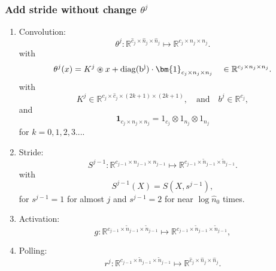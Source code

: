 \subsubsection{Add stride without change $\theta^j$}
\begin{enumerate}
	
	\item Convolution: 
	\begin{equation}
	\theta^j: \mathbb R^{\hat c_j \times \hat{n}_{j} \times \hat n_{j} } \mapsto \mathbb{R}^{c_j \times n_{j} \times n_j }.
	\end{equation}
	with
	\begin{equation}
	\theta^j(x) = K^j \circledast x + {\rm{diag}(b^j)} \cdot \bm{1}_{c_j \times n_j \times n_j} \quad
	\in\mathbb R^{c_j\times n_j\times n_j}.
	\end{equation}
	with 
	\begin{equation}
	K^j \in \mathbb{R}^{ c_{j} \times \hat c_{j} \times (2k+1) \times (2k+1)},  \quad \text{and} \quad b^j \in \mathbb{R}^{c_j},
	\end{equation}
	and 
	\begin{equation}
	\bm{1}_{c_j \times n_j \times n_j} = 1_{c_{j}} \otimes 1_{n_j} \otimes 1_{n_j}
	\end{equation}
	for $k = 0, 1, 2, 3...$.
	
	\item Stride: 
	\begin{equation}
	S^{j-1}: \mathbb R^{ c_{j-1} \times {n}_{j-1} \times  n_{j-1}} \mapsto \mathbb{R}^{ c_{j-1} \times\tilde n_{j-1} \times\tilde  n_{j-1} }.
	\end{equation}
	with
	\begin{equation}
	S^{j-1}(X) = S(X, s^{j-1}),
	\end{equation}
	for $s^{j-1} = 1$ for almost $j$ and $s^{j-1} = 2$ for near $\log \hat n_0$ times.
	
	\item Activation: 
	\begin{equation}\label{CNN_iteration_vector}
	g: \mathbb R^{c_{j-1} \times \tilde n_{j-1} \times \tilde  n_{j-1} }\mapsto  \mathbb R^{c_{j-1} \times \tilde n_{j-1} \times \tilde n_{j-1}},
	\end{equation}
	
	\item Polling:
	\begin{equation}\label{CNN_iteration_vector}
	r^j: \mathbb R^{c_{j-1} \times \tilde n_{j-1} \times\tilde n_{j-1} }\mapsto  \mathbb R^{\hat c_j \times \hat n_{j} \times\hat n_j }. 
	\end{equation}
\end{enumerate}


